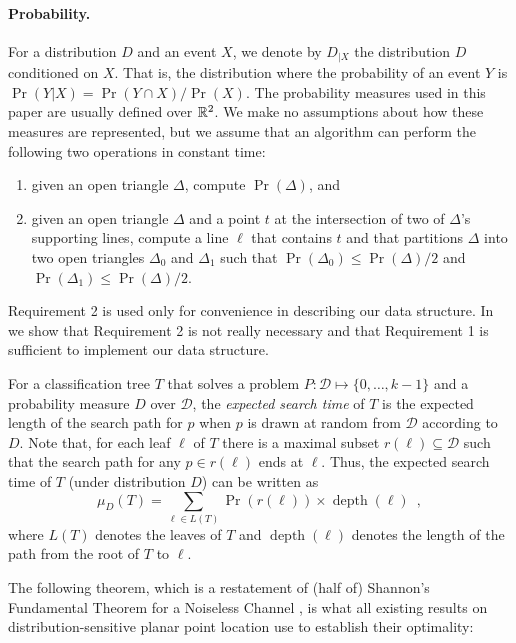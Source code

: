 \documentclass[charterfonts,lotsofwhite]{patmorin}
\DeclareMathOperator{\depth}{depth}
\begin{document}
\paragraph{Probability.}

For a distribution $D$ and an event $X$, we denote by $D_{|X}$ the
distribution $D$ conditioned on $X$.  That is, the distribution where
the probability of an event $Y$ is $\Pr(Y|X)=\Pr(Y\cap X)/\Pr(X)$.
The probability measures used in this paper are usually defined over
$\mathbb{R}^2$.  We make no assumptions about how these measures are
represented, but we assume that an algorithm can perform the following
two operations in constant time:
\begin{enumerate}
\item given an open triangle $\Delta$, compute $\Pr(\Delta)$, and
\item given an open triangle $\Delta$ and a point $t$ at the
intersection of two of $\Delta$'s supporting lines, compute a line $\ell$
that contains $t$ and that partitions $\Delta$ into two open triangles
$\Delta_0$ and $\Delta_1$ such that $\Pr(\Delta_0)\le\Pr(\Delta)/2$
and $\Pr(\Delta_1)\le\Pr(\Delta)/2$.
\end{enumerate}
Requirement 2 is used only for convenience in describing our data
structure.  In  we show that 
Requirement 2 is not really necessary and that Requirement 1 is sufficient to
implement our data structure.

For a classification tree $T$ that solves a problem
$P:\mathcal{D}\mapsto\{0,\ldots,k-1\}$ and a probability measure $D$
over $\mathcal{D}$, the \emph{expected search time} of $T$ is the
expected length of the search path for $p$ when $p$ is drawn at random
from $\mathcal{D}$ according to $D$.  Note that, for each leaf $\ell$
of $T$ there is a maximal subset $r(\ell)\subseteq \mathcal{D}$ such
that the search path for any $p\in r(\ell)$ ends at $\ell$.  Thus, the
expected search time of $T$ (under distribution $D$) can be written as
\[
     \mu_D(T) = \sum_{\ell\in L(T)} \Pr(r(\ell))\times \depth(\ell)
	\enspace ,
\]
where $L(T)$ denotes the leaves of $T$ and $\depth(\ell)$ denotes the
length of the path from the root of $T$ to $\ell$.

The following theorem, which is a restatement of (half of) Shannon's
Fundamental Theorem for a Noiseless Channel \cite[Theorem 9]{s48}, is
what all existing results on distribution-sensitive planar point
location use to establish their optimality:
\end{document}
